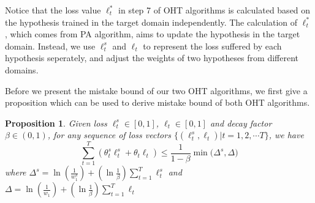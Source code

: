 \documentclass{article} %
\newtheorem{prop}{Proposition}
\theoremstyle{remark}
\theoremstyle{definition}
\begin{document}
Notice that the loss value $\ell_{t}^{*}$ in step 7 of OHT algorithms is calculated based on the hypothesis trained in the target domain independently.
The calculation of $\ell_{t}^{*}$, which comes from PA algorithm, aims to update the hypothesis in the target domain.
Instead, we use $\ell_{t}^{s}$ and $\ell_t$ to represent the loss suffered by each hypothesis seperately, and adjust the weights of two hypotheses from different domains.

Before we present the mistake bound of our two OHT algorithms, we first give a proposition which can be used to derive mistake bound of both OHT algorithms.

\begin{prop}
Given loss $\ell_{t}^{s} \in [0,1]$, $\ell_t \in [0,1]$ and decay factor $\beta \in (0,1)$, for any sequence of loss vectors $\{ (\ell_{t}^{s}, \ell_{t}) | t = 1, 2, \cdots T \} $, we have
$$ \sum\limits_{t=1}^{T} ( \theta_{t}^{s} \ell_{t}^{s} + \theta_t \ell_t ) \leq \frac{1}{1-\beta} \min \big( \varDelta^s, \varDelta \big) $$
where
$ \varDelta^s = \ln(\frac{1}{w_{1}^{s}}) + (\ln \frac{1}{\beta}) \sum\limits_{t=1}^{T} \ell_{t}^{s} $ and $ \varDelta = \ln(\frac{1}{w_{1}}) + (\ln \frac{1}{\beta}) \sum\limits_{t=1}^{T} \ell_{t} $
\end{prop}
\end{document}
